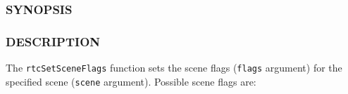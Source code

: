\begin{Shaded}
\begin{Highlighting}[]
\OperatorTok{{-}}
\end{Highlighting}
\end{Shaded}

\subsubsection{SYNOPSIS}\label{synopsis}

\begin{Shaded}
\begin{Highlighting}[]

\OperatorTok{\{}
\OperatorTok{=} \OperatorTok{,}
\OperatorTok{=} \OperatorTok{(} \OperatorTok{\textless{}\textless{}} \OperatorTok{),}
\OperatorTok{=} \OperatorTok{(} \OperatorTok{\textless{}\textless{}} \OperatorTok{),}
\OperatorTok{=} \OperatorTok{(} \OperatorTok{\textless{}\textless{}} \OperatorTok{),}
\OperatorTok{=} \OperatorTok{(} \OperatorTok{\textless{}\textless{}} \OperatorTok{)}
\OperatorTok{\};}

\OperatorTok{(}\OperatorTok{,} \OperatorTok{);}
\end{Highlighting}
\end{Shaded}

\subsubsection{DESCRIPTION}\label{description}

The \texttt{rtcSetSceneFlags} function sets the scene flags
(\texttt{flags} argument) for the specified scene (\texttt{scene}
argument). Possible scene flags are:

